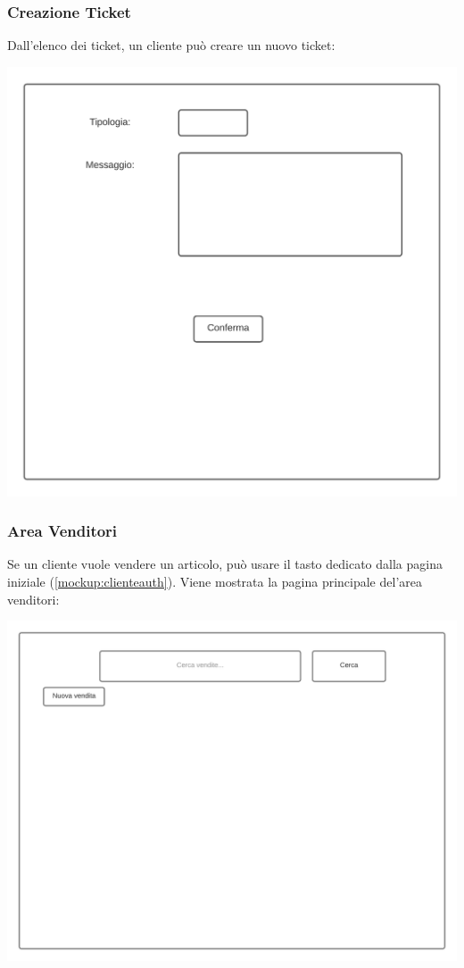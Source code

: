 \documentclass[12pt]{article}
\begin{document}
\newpage

\subsubsection{Creazione Ticket}
Dall'elenco dei ticket, un cliente può creare un nuovo ticket:

\begin{center}
\includegraphics[height=0.3\textheight]{Mockup/Cliente/NuovoTicket}
\end{center}

\subsubsection{Area Venditori}
\label{mockup:areavenditori}
Se un cliente vuole vendere un articolo, può usare il tasto dedicato dalla pagina iniziale (\ref{mockup:clienteauth}). Viene mostrata la pagina principale del'area venditori:

\begin{center}
\includegraphics[height=0.3\textheight]{Mockup/Cliente/AreaVenditori}
\end{center}
\end{document}
